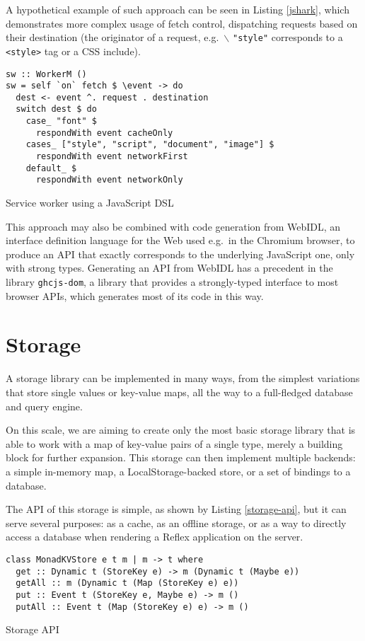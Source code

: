 \documentclass[english,odsaz]{fitthesis}
\begin{document}
A hypothetical example of such approach can be seen in Listing \ref{jshark}, which
demonstrates more complex usage of fetch control, dispatching requests based on
their destination (the originator of a request, e.g.~$\backslash$ \texttt{"style"} corresponds
to a \texttt{<style>} tag or a CSS include).

\begin{listing}[htbp]
\begin{verbatim}
sw :: WorkerM ()
sw = self `on` fetch $ \event -> do
  dest <- event ^. request . destination
  switch dest $ do
    case_ "font" $
      respondWith event cacheOnly
    cases_ ["style", "script", "document", "image"] $
      respondWith event networkFirst
    default_ $
      respondWith event networkOnly
\end{verbatim}
\caption{Service worker using a JavaScript DSL \label{jshark}}
\end{listing}

This approach may also be combined with code generation from WebIDL, an
interface definition language for the Web \cite{webidl} used e.g.~in the Chromium
browser, to produce an API that exactly corresponds to the underlying JavaScript
one, only with strong types. Generating an API from WebIDL has a precedent in
the library \texttt{ghcjs-dom}, a library that provides a strongly-typed interface to
most browser APIs, which generates most of its code in this way.
\section{Storage}
\label{sec:orgcf114e3}
A storage library can be implemented in many ways, from the simplest variations
that store single values or key-value maps, all the way to a full-fledged
database and query engine.

On this scale, we are aiming to create only the most basic storage library that
is able to work with a map of key-value pairs of a single type, merely a
building block for further expansion. This storage can then implement multiple
backends: a simple in-memory map, a LocalStorage-backed store, or a set of
bindings to a database.

The API of this storage is simple, as shown by Listing \ref{storage-api}, but it
can serve several purposes: as a cache, as an offline storage, or as a way to
directly access a database when rendering a Reflex application on the server.

\begin{listing}[htbp]
\begin{verbatim}
class MonadKVStore e t m | m -> t where
  get :: Dynamic t (StoreKey e) -> m (Dynamic t (Maybe e))
  getAll :: m (Dynamic t (Map (StoreKey e) e))
  put :: Event t (StoreKey e, Maybe e) -> m ()
  putAll :: Event t (Map (StoreKey e) e) -> m ()
\end{verbatim}
\caption{Storage API \label{storage-api}}
\end{listing}
\end{document}
